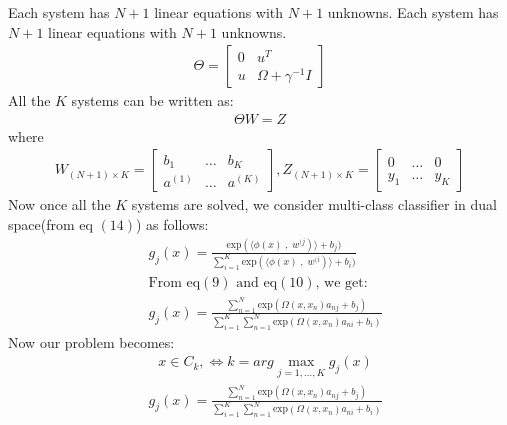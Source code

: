 \documentclass[conference]{IEEEtran}
\begin{document}
    Each system has $N+1$ linear equations with $N+1$ unknowns. Each system has $N+1$ linear equations with $N+1$
    unknowns.
    \begin{align}
        \Theta = \begin{bmatrix}
                     0 & u^{T}                 \\
                     u & \Omega + \gamma^{-1}I
        \end{bmatrix}
    \end{align}
    All the $K$ systems can be written as:
    \begin{align}
        \Theta W = Z
    \end{align}
    where
    \begin{align*}
        W_{(N+1) \times K} = \begin{bmatrix}
                                 b_{1}   & \ldots & b_{K}   \\
                                 a^{(1)} & \ldots & a^{(K)}
        \end{bmatrix}
        , Z_{(N+1) \times K} = \begin{bmatrix}
                                   0     & \ldots & 0     \\
                                   y_{1} & \ldots & y_{K}
        \end{bmatrix}
    \end{align*}
    Now once all the $K$ systems are solved, we consider multi-class classifier in dual space(from eq $(14)$) as follows:
    \begin{align*}
        &g_{j}(x) = \frac{\text{exp}(\langle \phi(x)\;,\; w^{(j})\rangle + b_{j})}{\sum_{i=1}^{K} \text{exp}(\langle \phi(x)\;,\; w^{(i})\rangle + b_{i})}\\
        &\text{From eq$(9)$ and eq$(10)$, we get:} \\
        &g_{j}(x) = \frac{\sum_{n=1}^{N}\text{exp}(\Omega(x,x_{n})a_{nj} + b_{j})}{\sum_{i=1}^{K} \sum_{n=1}^{N}\text{exp}(\Omega(x,x_{n})a_{ni} + b_{i})}
    \end{align*}
    Now our problem becomes:
    \begin{align}
        & x \in C_{k}, \Leftrightarrow k= arg \max_{j=1,\ldots,K} g_{j}(x)
    \end{align}
    \begin{align*}
        & g_{j}(x) = \frac{\sum_{n=1}^{N}\text{exp}(\Omega(x,x_{n})a_{nj} + b_{j})}{\sum_{i=1}^{K} \sum_{n=1}^{N}\text{exp}(\Omega(x,x_{n})a_{ni} + b_{i})}
    \end{align*}
     \\
\end{document}
